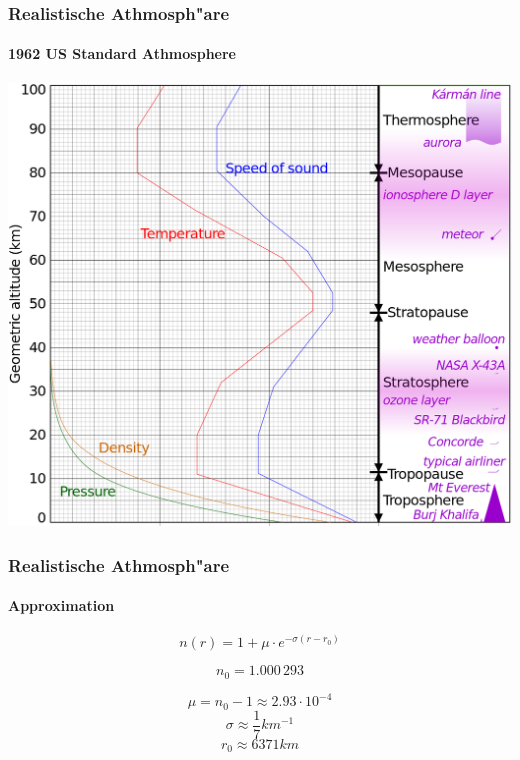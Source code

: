 \documentclass{beamer}
\begin{document}
  \begin{frame}
    \frametitle{Realistische Athmosph"are}
    \framesubtitle{1962 US Standard Athmosphere}

    \begin{center}
      \includegraphics[scale=0.26]{../images/athmosphereProfileCut.png}
    \end{center}    
    
  \end{frame}
  
  \begin{frame}
    \frametitle{Realistische Athmosph"are}
    \framesubtitle{Approximation}
    
    $$n(r) = 1 + \mu \cdot e^{-\sigma (r - r_0)}$$

    $$n_0 = 1.000\,293$$    
    
    $$\mu = n_0 - 1 \approx 2.93 \cdot 10^{-4}$$
    $$\sigma \approx \frac{1}{7} km^{-1}$$
    $$r_0 \approx 6371 km$$
  \end{frame}
  
\end{document}

